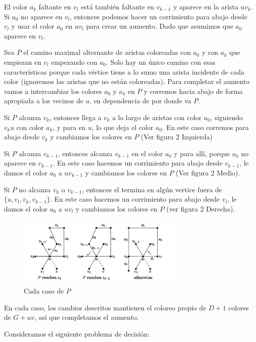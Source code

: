 \documentclass[a4paper]{article}
\begin{document}
El color $a_k$ faltante en $v_l$ est\'a tambi\'en faltante en $v_{k-1}$ y aparece en la arista $uv_k$. Si $a_0$ no aparece en $v_l$, entonces podemos hacer un corrimiento para abajo desde $v_l$ y usar el color $a_0$ en $uv_l$ para crear un aumento. Dado que asumimos que $a_0$ aparece en $v_l$.

Sea $P$ el camino maximal alternante de aristas coloreadas con $a_0$ y con $a_k$ que empiezan en $v_l$ empezando con $a_0$. Solo hay un \'unico camino con esas caracter\'isticas porque cada v\'ertice tiene a lo sumo una arista incidente de cada color (ignoremos las aristas que no est\'an coloreadas). Para completar el aumento vamos a intercambiar los colores $a_0$ y $a_k$ en $P$ y corremos hacia abajo de forma apropiada a los vecinos de $u$, en dependencia de por donde va $P$.

Si $P$ alcanza $v_k$, entonces llega a $v_k$ a lo largo de aristas con color $a_0$, siguiendo $v_ku$ con color $a_k$, y para en $u$, lo que deja el color $a_0$. En este caso corremos para abajo desde $v_k$ y cambiamos los colores en $P$ (Ver figura 2 Izquierda)

Si $P$ alcanza $v_{k-1}$, entonces alcanza $v_{k-1}$ en el color $a_0$ y para all\'i, porque $a_k$ no aparece en $v_{k-1}$. En este caso hacemos un corrimiento para abajo desde $v_{k-1}$, le damos el color $a_0$ a $uv_{k-1}$ y cambiamos los colores en $P$ (Ver figura 2 Medio).

Si $P$ no alcanza $v_k$ o $v_{k-1}$, entonces el termina en alg\'un vertice fuera de $\{u, v_l, v_k, v_{k-1}\}$. En este caso hacemos un corrimiento para abajo desde $v_l$, le damos el color $a_0$ a $uv_l$ y cambiamos los colores en $P$ (ver figura 2 Derecha).
\begin{figure}
    \begin{center}
        \includegraphics[width=8cm]{image2.png}
        \caption{Cada caso de $P$} 
    \end{center}
\end{figure}
En cada caso, los cambios descritos mantienen el coloreo propio de $D+1$ colores de $G + uv$, as\'i que completamos el aumento.

Consideramos el siguiente problema de decisión:
\end{document}
